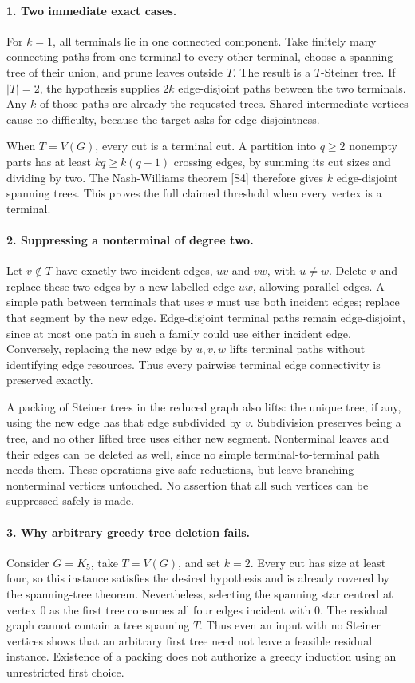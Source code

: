 \documentclass[11pt,a4paper]{article}
\begin{document}
\paragraph{1. Two immediate exact cases.}
For $k=1$, all terminals lie in one connected component. Take finitely
many connecting paths from one terminal to every other terminal,
choose a spanning tree of their union, and prune leaves outside $T$.
The result is a $T$-Steiner tree. If $|T|=2$, the hypothesis supplies
$2k$ edge-disjoint paths between the two terminals. Any $k$ of those
paths are already the requested trees. Shared intermediate vertices
cause no difficulty, because the target asks for edge disjointness.

When $T=V(G)$, every cut is a terminal cut. A partition into $q\ge2$
nonempty parts has at least $kq\ge k(q-1)$ crossing edges, by summing
its cut sizes and dividing by two. The Nash-Williams theorem [S4]
therefore gives $k$ edge-disjoint spanning trees. This proves the full
claimed threshold when every vertex is a terminal.

\paragraph{2. Suppressing a nonterminal of degree two.}
Let $v\notin T$ have exactly two incident edges, $uv$ and $vw$, with
$u\ne w$. Delete $v$ and replace these two edges by a new labelled
edge $uw$, allowing parallel edges. A simple path between terminals
that uses $v$ must use both incident edges; replace that segment by
the new edge. Edge-disjoint terminal paths remain edge-disjoint, since
at most one path in such a family could use either incident edge.
Conversely, replacing the new edge by $u,v,w$ lifts terminal paths
without identifying edge resources. Thus every pairwise terminal edge
connectivity is preserved exactly.

A packing of Steiner trees in the reduced graph also lifts: the
unique tree, if any, using the new edge has that edge subdivided by
$v$. Subdivision preserves being a tree, and no other lifted tree
uses either new segment. Nonterminal leaves and their edges can be
deleted as well, since no simple terminal-to-terminal path needs them.
These operations give safe reductions, but leave branching nonterminal
vertices untouched. No assertion that all such vertices can be
suppressed safely is made.

\paragraph{3. Why arbitrary greedy tree deletion fails.}
Consider $G=K_5$, take $T=V(G)$, and set $k=2$. Every cut has size at
least four, so this instance satisfies the desired hypothesis and is
already covered by the spanning-tree theorem. Nevertheless, selecting
the spanning star centred at vertex $0$ as the first tree consumes
all four edges incident with $0$. The residual graph cannot contain
a tree spanning $T$. Thus even an input with no Steiner vertices
shows that an arbitrary first tree need not leave a feasible residual
instance. Existence of a packing does not authorize a greedy induction
using an unrestricted first choice.
\end{document}
